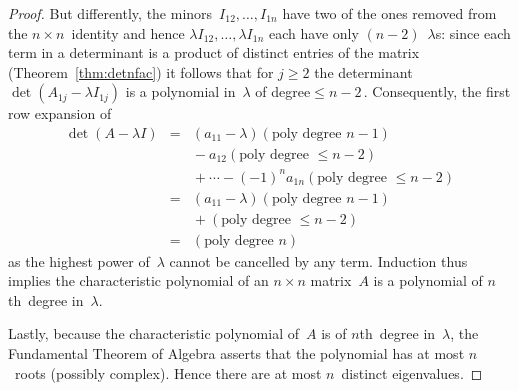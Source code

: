 \begin{proof}
But differently, the minors~\(I_{12},\ldots,I_{1n}\) have two of the ones removed from the \(n\times n\)~identity and hence \(\lambda I_{12},\ldots,\lambda I_{1n}\) each have only \((n-2)\)~\(\lambda\)s: since each term in a determinant is a product of distinct entries of the matrix (Theorem~\ref{thm:detnfac}) it follows that for \(j\geq2\) the determinant \(\det(A_{1j}-\lambda I_{1j})\) is a polynomial in~\(\lambda\) of degree\({}\leq n-2\)\,.
Consequently, the first row expansion of 
\begin{eqnarray*}
\det(A-\lambda I)
&=&(a_{11}-\lambda)(\text{poly degree }n-1)
\\&&{}
-a_{12}(\text{poly degree }\leq n-2)
\\&&{}
+\cdots-(-1)^{n}a_{1n}(\text{poly degree }\leq n-2)
\\&=&(a_{11}-\lambda)(\text{poly degree }n-1)
\\&&{}
+(\text{poly degree }\leq n-2)
\\&=&(\text{poly degree }n)
\end{eqnarray*}
as the highest power of~\(\lambda\) cannot be cancelled by any term.
Induction thus implies the characteristic polynomial of an \(n\times n\) matrix~\(A\) is a polynomial of \(n\)th~degree in~\(\lambda\).

Lastly, because the characteristic polynomial of~\(A\) is of \(n\)th~degree in~\(\lambda\), the Fundamental Theorem of Algebra asserts that the polynomial has at most \(n\)~roots (possibly complex).  
Hence there are at most \(n\)~distinct eigenvalues.
\end{proof}



